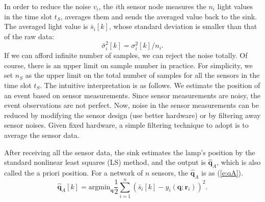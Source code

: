 In order to reduce the noise $v_i$, the $i$th sensor node measures the $n_i$ light values in the time slot $t_S$, averages them and sends the averaged value back to the sink. The averaged light value is $\bar{s}_i[k]$, whose standard deviation is smaller than that of the raw data:
$$\bar{\sigma}_i^2[k]=\sigma_i^2[k]/n_i.$$
 If we can afford infinite number of samples, we can reject the noise totally. Of course, there is an upper limit on sample number in practice. For simplicity, we set $n_S$ as the upper limit on the total number of samples for all the sensors in the time slot $t_S$.
    The intuitive interpretation is as follows.
We estimate the position of an event based on sensor measurements.
Since sensor measurements are noisy, the event observations are not perfect.
Now, noise in the sensor measurements can be reduced by modifying the sensor design (use better hardware) or by filtering
away sensor noises. Given fixed hardware, a simple filtering technique to adopt is to average the sensor data.

After receiving all the sensor data, the sink estimates the lamp's position by the standard nonlinear least squares (LS) method, and the output is $\hat{\mathbf{q}}_A$, which is also called the a priori position. For a network of $n$ sensors, the $\hat{\mathbf{q}}_A$ is as (\ref{e:qA}).
\begin{equation}\label{e:qA}
    \hat{\mathbf{q}}_A[k] = \mathrm{argmin}_{\mathbf{q}} \frac{1}{2} \sum_{i=1}^{n} (\bar{s}_i[k]-y_i(\mathbf{q}; \mathbf{r}_i))^2.
\end{equation}



